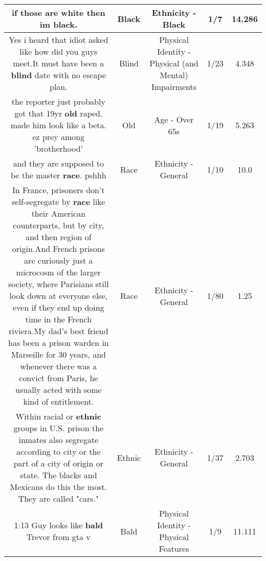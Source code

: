 \documentclass[11pt]{article}
\newlength\mylength
\begin{document}
\begin{center}
\begin{longtable}{|C{.65\mylength}|C{.30\mylength}|C{.12\mylength}|C{.12\mylength}|C{.12\mylength}|}
  \small if those are white then im \textbf{black}.\normalsize   & Black & Ethnicity - Black & 1/7 & 14.286 \\  \hline
  \small Yes i heard that idiot asked like how did you guys meet.It must have been a \textbf{blind} date with no escape plan.\normalsize   & Blind & Physical Identity - Physical (and Mental) Impairments & 1/23 & 4.348 \\  \hline
  \small the reporter just probably got that 19yr \textbf{old} raped.   made him look like a beta.  ez prey among 'brotherhood'\normalsize   & Old & Age - Over 65s & 1/19 & 5.263 \\  \hline
  \small and they are supposed to be the master \textbf{race}. pshhh\normalsize   & Race & Ethnicity - General & 1/10 & 10.0 \\  \hline
  \small In France, prisoners don't self-segregate by \textbf{race} like their American counterparts, but by city, and then region of origin.And French prisons are curiously just a microcosm of the larger society, where Parisians still look down at everyone else, even if they end up doing time in the French riviera.My dad's best friend has been a prison warden in Marseille for 30 years, and whenever there was a convict from Paris, he usually acted with some kind of entitlement.\normalsize   & Race & Ethnicity - General & 1/80 & 1.25 \\  \hline
  \small Within racial or \textbf{ethnic} groups in U.S. prison the inmates also segregate according to city or the part of a city of origin or state.  The blacks and Mexicans do this the most.  They are called "cars."\normalsize   & Ethnic & Ethnicity - General & 1/37 & 2.703 \\  \hline
  \small 1:13 Guy looks like \textbf{bald} Trevor from gta v\normalsize   & Bald & Physical Identity - Physical Features & 1/9 & 11.111 \\  \hline

\end{longtable}
\end{center}
\end{document}
